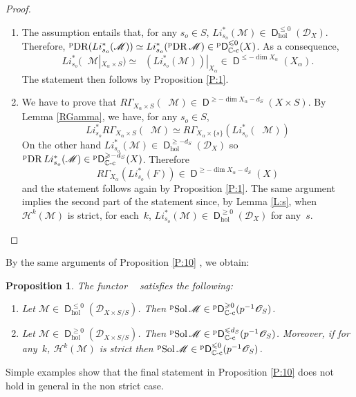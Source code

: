 \documentclass[english]{smfart}
\numberwithin{subsection}{section}
\def\shd{\mathcal{D}}\let\cD\shd
\def\shh{\mathcal{H}}
\def\shh{\mathcal{H}}
\def\shm{\mathcal{M}}
\def\sho{\mathcal{O}}\let\cO\sho
\newcommand{\C}{\mathbb{C}}\let\CC\C
\newcommand{\hol}{\mathrm{hol}}
\newcommand{\cc}{{\C\textup{-c}}}
\newcommand{\XS}{X\times S}
\newcommand{\DXS}{\shd_{\XS/S}}
\DeclareMathOperator{\pD}{{}^\mathrm{p}\mathsf{D}}
\DeclareMathOperator{\rD}{\mathsf{D}}
\DeclareMathOperator{\pDR}{{}^\mathrm{p}DR}
\DeclareMathOperator{\pSol}{{}^\mathrm{p}Sol}
\let\leq\leqslant
\let\geq\geqslant
\newcommand{\pOS}{p^{-1}\sho_S}
\numberwithin{equation}{section}
\theoremstyle{plain}
\newtheorem{proposition}[equation]{Proposition}
\theoremstyle{definition}
\begin{document}
\begin{proof}\mbox{}
\begin{enumerate}
\item
The assumption entails that, for any $s_o\in S$, $Li^*_{s_o}(\shm)\in \rD^{\leq0}_\hol(\shd_{X})$. Therefore, $\pDR(Li^*_{s_o}(\shm))\simeq Li^*_{s_o}(\pDR\shm)\in \pD^{\leq0}_\cc(X)$. As a consequence,
$$Li^*_{s_o} (\pDR\shm|_{X_{\alpha}\times S})\simeq \pDR(Li^*_{s_o}(\shm))|_{X_{\alpha}}\in \rD^{\leq -\dim X_{\alpha}}(X_{\alpha}).$$ The statement then follows by Proposition \ref{P:1}.

\item
We have to prove that $R\Gamma_{X_{\alpha}\times S}(\pDR \shm)\in \rD^{\geq -\dim X_{\alpha}-d_S}(\XS)$. By Lemma \ref{RGamma}, we have, for any $s_o\in S$,
$$Li^*_{s_o} R\Gamma_{X_{\alpha}\times S}(\pDR\shm)\simeq R\Gamma_{X_{\alpha}\times \{s\}}(Li^*_{s_o}(\pDR\shm))$$
On the other hand $Li^*_{s_o}(\shm)\in \rD^{\geq-d_S}_\hol(\shd_X)$ so $\pDR Li^*_{s_o}(\shm)\in
\pD^{\geq-d_S}_\cc(X)$. Therefore
$$R\Gamma_{X_{\alpha}}(Li^*_{s_o}(F))\in \rD^{\geq-\dim X_{\alpha}-d_S}(X)$$
and the statement follows again by Proposition \ref{P:1}. The same argument implies the second part of the statement since, by Lemma \ref{L:s}, when $\shh^k(\shm)$ is strict, for each~$k$, $Li^*_{s_o}(\shm)\in \rD^{\geq 0}_\hol(\shd_X)$ for any~$s$.\qedhere
\end{enumerate}
\end{proof}

By the same arguments of Proposition \ref{P:10} , we obtain:

\begin{proposition}\label{P:12}
The functor $\pSol$ satisfies the following:
\begin{enumerate}
\item
Let $\shm\in \rD^{\leq0}_\hol(\DXS)$. Then $\pSol\shm\in \pD^{\geq0}_\cc(\pOS)$.

\item
Let $\shm\in \rD^{\geq0}_\hol(\DXS)$. Then $\pSol\shm\in \pD^{\leq d_S}_\cc(\pOS)$. Moreover, if for any~$k$, $\shh^k(\shm)$ is strict then $\pSol\shm\in \pD^{\leq 0}_\cc(\pOS)$.
\end{enumerate}
\end{proposition}

Simple examples show that the final statement in Proposition \ref{P:10} does not hold in general in the non strict case.
\end{document}

